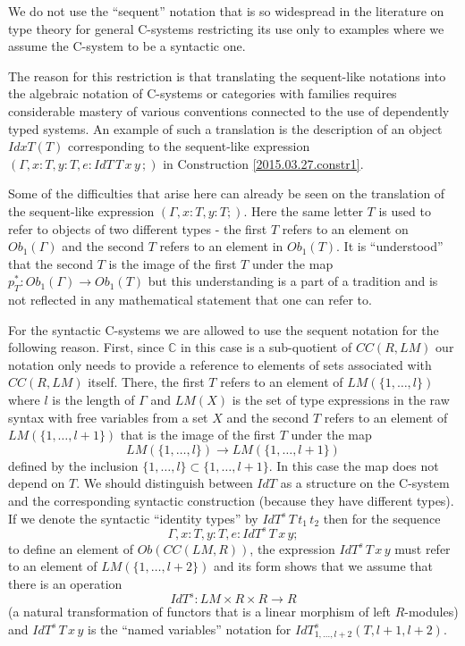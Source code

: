 \documentclass[12pt]{article}
\numberwithin{equation}{section}
\newcommand{\sr}{\rightarrow}
\newcommand{\toCC}{CC} %
\newcommand{\aCC}{{\mathbb C}}  %
\begin{document}
We do not use the ``sequent'' notation that is so widespread in the literature
on type theory for general C-systems restricting its use only to examples where
we assume the C-system to be a syntactic one.

The reason for this restriction is that translating the sequent-like notations
into the algebraic notation of C-systems or categories with families requires
considerable mastery of various conventions connected to the use of dependently
typed systems. An example of such a translation is the description of an object
$IdxT(T)$ corresponding to the sequent-like expression $(\Gamma, x:T, y:T,
e:IdT\, T\, x\, y\,;)$ in Construction \ref{2015.03.27.constr1}.

Some of the difficulties that arise here can already be seen on the translation
of the sequent-like expression $(\Gamma, x:T, y:T;)$. Here the same letter $T$
is used to refer to objects of two different types - the first $T$ refers to an
element on $Ob_1(\Gamma)$ and the second $T$ refers to an element in
$Ob_1(T)$. It is ``understood'' that the second $T$ is the image of the first
$T$ under the map $p_T^*:Ob_1(\Gamma)\sr Ob_1(T)$ but this understanding is a
part of a tradition and is not reflected in any mathematical statement that one
can refer to.

For the syntactic C-systems we are allowed to use the sequent notation for the
following reason. First, since $\aCC$ in this case is a sub-quotient of
$\toCC(R,LM)$ our notation only needs to provide a reference to elements of sets
associated with $\toCC(R,LM)$ itself.  There, the first $T$ refers to an element
of $LM(\{1,\dots,l\})$ where $l$ is the length of $\Gamma$ and $LM(X)$ is the
set of type expressions in the raw syntax with free variables from a set $X$
and the second $T$ refers to an element of $LM(\{1,\dots,l+1\})$ that is the
image of the first $T$ under the map
%
$$LM(\{1,\dots,l\})\sr LM(\{1,\dots,l+1\})$$
%
defined by the inclusion $\{1,\dots,l\}\subset \{1,\dots,l+1\}$. In this case
the map does not depend on $T$. We should distinguish between $IdT$ as a
structure on the C-system and the corresponding syntactic construction (because
they have different types). If we denote the syntactic ``identity types'' by
$IdT^s\, T\, t_1\, t_2$ then for the sequence
%
$$\Gamma, x:T, y:T, e:IdT^s\,T\,x\,y;$$
%
to define an element of $Ob(\toCC(LM,R))$, the expression $IdT^s\,T\,x\,y$ must
refer to an element of $LM(\{1,\dots,l+2\})$ and its form shows that we assume
that there is an operation
%
$$IdT^s:LM\times R\times R\sr R$$
%
(a natural transformation of functors that is a linear morphism of left
$R$-modules) and $IdT^s\,T\,x\,y$ is the ``named variables'' notation for
$IdT^s_{{1,\dots,l+2}}(T,l+1,l+2)$.
\end{document}
